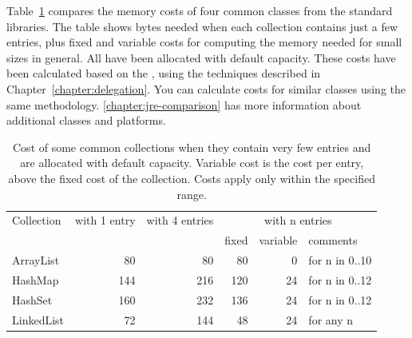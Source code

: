 
 
Table~\ref{tab:small-collections-default} compares the memory costs of four
common classes from the standard libraries.
The table shows bytes needed when each collection contains just a few
entries, plus fixed and variable costs for computing the memory needed for small sizes
in general. All have been allocated with default capacity.
These costs have been calculated based on the \oracle \jre,
using the techniques described in Chapter~\ref{chapter:delegation}.
You can calculate costs for similar classes using the same methodology.
\autoref{chapter:jre-comparison} has more information about additional classes
and \jre platforms.


\begin{table}
\centering
 		\begin{tabular}{l||r||r||rrl}
 		\toprule
	 	 Collection & with 1 entry & with 4 entries & \multicolumn{3}{c}{with n entries}\\
	 	 & & & fixed & variable & comments \\
	 	 \midrule
	 	ArrayList & 80 & 80 & 80 & 0 & for n in 0..10 \\
 		HashMap & 144 & 216 & 120 & 24 & for n in 0..12 \\
 		HashSet & 160 & 232 & 136 & 24 & for n in 0..12 \\
 		LinkedList & 72 & 144 & 48 & 24 & for any n \\
	 	\bottomrule
	 	\end{tabular}
	 	
	\caption{Cost of some common collections when they
	contain very few entries and are allocated with default capacity. Variable
	cost is the cost per entry, above the fixed cost of the collection. Costs apply only within the specified
	range.}
	\label{tab:small-collections-default}
\end{table}

